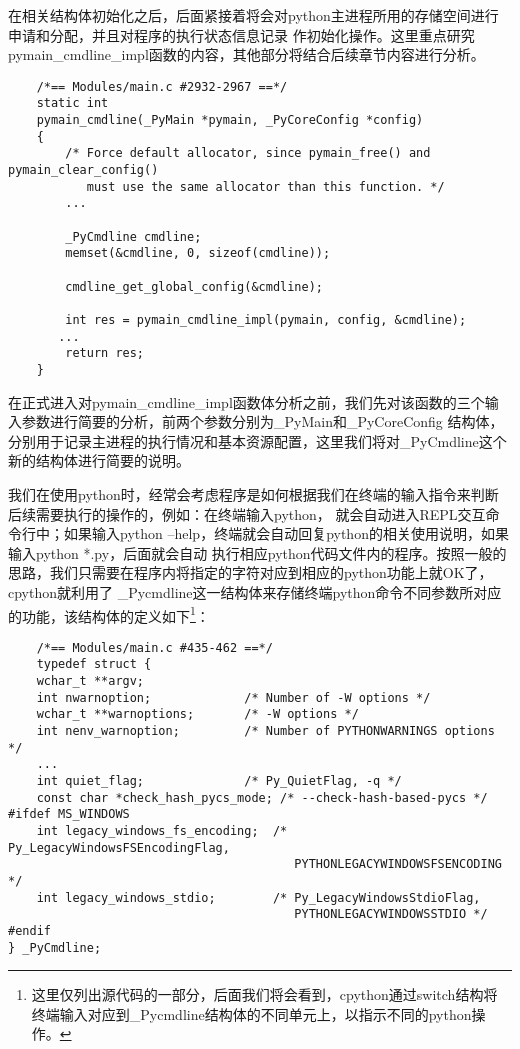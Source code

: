 \documentclass[UTF8]{book}
\begin{document}
在相关结构体初始化之后，后面紧接着将会对python主进程所用的存储空间进行申请和分配，并且对程序的执行状态信息记录
作初始化操作。这里重点研究pymain\_cmdline\_impl函数的内容，其他部分将结合后续章节内容进行分析。\par
\begin{lstlisting}
    /*== Modules/main.c #2932-2967 ==*/
    static int
    pymain_cmdline(_PyMain *pymain, _PyCoreConfig *config)
    {
        /* Force default allocator, since pymain_free() and pymain_clear_config()
           must use the same allocator than this function. */
        ...

        _PyCmdline cmdline;
        memset(&cmdline, 0, sizeof(cmdline));

        cmdline_get_global_config(&cmdline);

        int res = pymain_cmdline_impl(pymain, config, &cmdline);
       ...
        return res;
    }
\end{lstlisting}\par
在正式进入对pymain\_cmdline\_impl函数体分析之前，我们先对该函数的三个输入参数进行简要的分析，前两个参数分别为\_PyMain和\_PyCoreConfig
结构体，分别用于记录主进程的执行情况和基本资源配置，这里我们将对\_PyCmdline这个新的结构体进行简要的说明。\par
我们在使用python时，经常会考虑程序是如何根据我们在终端的输入指令来判断后续需要执行的操作的，例如：在终端输入python，
就会自动进入REPL交互命令行中；如果输入python --help，终端就会自动回复python的相关使用说明，如果输入python *.py，后面就会自动
执行相应python代码文件内的程序。按照一般的思路，我们只需要在程序内将指定的字符对应到相应的python功能上就OK了，cpython就利用了
\_Pycmdline这一结构体来存储终端python命令不同参数所对应的功能，该结构体的定义如下\footnote[1]{这里仅列出源代码的一部分，后面我们将会看到，cpython通过switch结构将
终端输入对应到\_Pycmdline结构体的不同单元上，以指示不同的python操作。}：
\begin{lstlisting}
    /*== Modules/main.c #435-462 ==*/
    typedef struct {
    wchar_t **argv;
    int nwarnoption;             /* Number of -W options */
    wchar_t **warnoptions;       /* -W options */
    int nenv_warnoption;         /* Number of PYTHONWARNINGS options */
    ...
    int quiet_flag;              /* Py_QuietFlag, -q */
    const char *check_hash_pycs_mode; /* --check-hash-based-pycs */
#ifdef MS_WINDOWS
    int legacy_windows_fs_encoding;  /* Py_LegacyWindowsFSEncodingFlag,
                                        PYTHONLEGACYWINDOWSFSENCODING */
    int legacy_windows_stdio;        /* Py_LegacyWindowsStdioFlag,
                                        PYTHONLEGACYWINDOWSSTDIO */
#endif
} _PyCmdline;
\end{lstlisting}
\end{document}
